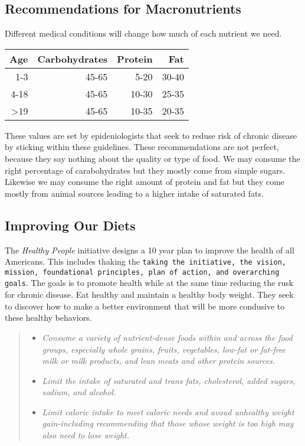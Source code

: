 \documentclass[letterpaper, 11pt]{article}
\begin{document}
\subsection{Recommendations for Macronutrients}
\label{sec:orgfe56348}
Different medical conditions will change how much of each nutrient we need.\\
\begin{center}
\begin{tabular}{rrrr}
Age & Carbohydrates & Protein & Fat\\
\hline
1-3 & 45-65 & 5-20 & 30-40\\
4-18 & 45-65 & 10-30 & 25-35\\
>19 & 45-65 & 10-35 & 20-35\\
\end{tabular}
\end{center}
These values are set by epideniologists that seek to reduse risk of chronic disease by sticking within these guidelines. These recommendations are not perfect, because they say nothing about the quality or type of food. We may consume the right percentage of carabohydrates but they mostly come from simple sugars. Likewise we may consume the right amount of protein and fat but they come mostly from animal sources leading to a higher intake of saturated fats.\\
\subsection{Improving Our Diets}
\label{sec:org59bf289}
The \emph{Healthy People} initiative designs a 10 year plan to improve the health of all Americans. This includes thaking the \texttt{taking the initiative, the vision, mission, foundational principles, plan of action, and overarching goals}. The goals is to promote health while at the same time reducing the rusk for chronic disease. Eat healthy and maintain a healthy body weight. They seek to discover how to make a better environment that will be more condusive to these healthy behaviors.\\
\begin{quote}
\begin{itemize}
\item \emph{Consume a variety of nutrient-dense foods within and across the food groups, especially whole grains, fruits, vegetables, low-fat or fat-free milk or milk products, and lean meats and other protein sources.}\\
\item \emph{Limit the intake of saturated and trans fats, cholesterol, added sugars, sodium, and alcohol.}\\
\item \emph{Limit caloric intake to meet caloric needs and avoud unhealthy weight gain-including recommending that those whose weight is too high may also need to lose weight.}\\
\end{itemize}
\end{quote}
\end{document}
